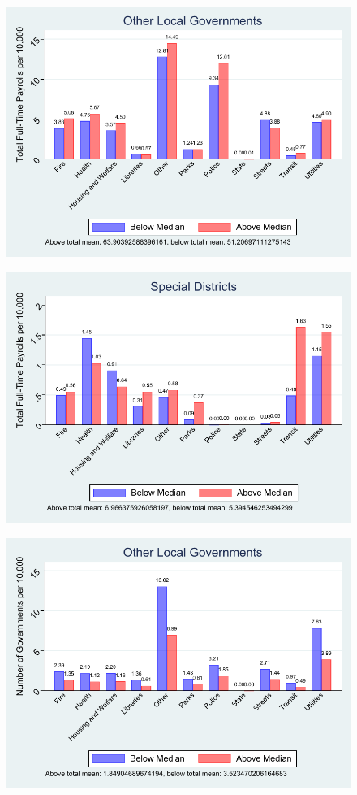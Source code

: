 \documentclass{article}
\begin{document}
\begin{figure}
	\includegraphics{figures/implications/spdist_emp_p_ftp__0.pdf}
\end{figure}
\begin{figure}
	\includegraphics{figures/implications/spdist_emp_p_ftp__1.pdf}
\end{figure}
\clearpage
\begin{figure}
	\includegraphics{figures/implications/spdist_emp_pc_0.pdf}
\end{figure}
\end{document}
